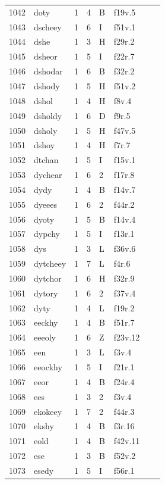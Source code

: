\documentclass[11pt,a4paper]{article}
\begin{document}
\begin{landscape}
\begin{longtable}{@{}r>{\ttfamily}lrrl>{\ttfamily}l>{\raggedright\arraybackslash}p{80mm}>{\raggedright\arraybackslash}p{36mm}@{}}
1042 & doty & 1 & 4 & B & f19v.5 &  & \\
1043 & dscheey & 1 & 6 & I & f51v.1 &  & \\
1044 & dshe & 1 & 3 & H & f29r.2 &  & \\
1045 & dsheor & 1 & 5 & I & f22r.7 &  & \\
1046 & dshodar & 1 & 6 & B & f32r.2 &  & \\
1047 & dshody & 1 & 5 & H & f51v.2 &  & \\
1048 & dshol & 1 & 4 & H & f8v.4 &  & \\
1049 & dsholdy & 1 & 6 & D & f9r.5 &  & \\
1050 & dsholy & 1 & 5 & H & f47v.5 &  & \\
1051 & dshoy & 1 & 4 & H & f7r.7 &  & \\
1052 & dtchan & 1 & 5 & I & f15v.1 &  & \\
1053 & dychear & 1 & 6 & 2 & f17r.8 &  & \\
1054 & dydy & 1 & 4 & B & f14v.7 &  & \\
1055 & dyeees & 1 & 6 & 2 & f44r.2 &  & \\
1056 & dyoty & 1 & 5 & B & f14v.4 &  & \\
1057 & dypchy & 1 & 5 & I & f13r.1 &  & \\
1058 & dys & 1 & 3 & L & f36v.6 &  & \\
1059 & dytcheey & 1 & 7 & L & f4r.6 &  & \\
1060 & dytchor & 1 & 6 & H & f32r.9 &  & \\
1061 & dytory & 1 & 6 & 2 & f37v.4 &  & \\
1062 & dyty & 1 & 4 & L & f19r.2 &  & \\
1063 & eeckhy & 1 & 4 & B & f51r.7 &  & \\
1064 & eeeoly & 1 & 6 & Z & f23v.12 &  & \\
1065 & een & 1 & 3 & L & f3v.4 &  & \\
1066 & eeockhy & 1 & 5 & I & f21r.1 &  & \\
1067 & eeor & 1 & 4 & B & f24r.4 &  & \\
1068 & ees & 1 & 3 & 2 & f3v.4 &  & \\
1069 & ekokeey & 1 & 7 & 2 & f44r.3 &  & \\
1070 & ekshy & 1 & 4 & B & f3r.16 &  & \\
1071 & eold & 1 & 4 & B & f42v.11 &  & \\
1072 & ese & 1 & 3 & B & f52v.2 &  & \\
1073 & esedy & 1 & 5 & I & f56r.1 &  & \\

\end{longtable}
\end{landscape}
\end{document}
